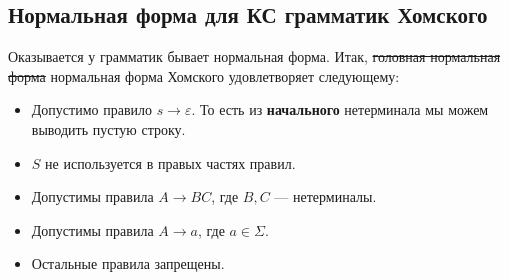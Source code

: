 \subsection{Нормальная форма для КС грамматик Хомского}
  Оказывается у грамматик бывает нормальная форма. Итак, \sout{головная нормальная форма} нормальная форма Хомского удовлетворяет следующему:
\begin{itemize}
  \item Допустимо правило $s \to \varepsilon$. То есть из \textbf{начального} нетерминала мы можем выводить пустую строку.
  \item $S$ не используется в правых частях правил.
  \item Допустимы правила $A \to BC$, где $B, C$ --- нетерминалы.
  \item Допустимы правила $A \to a$, где $a \in \Sigma$.
  \item Остальные правила запрещены.
\end{itemize}

